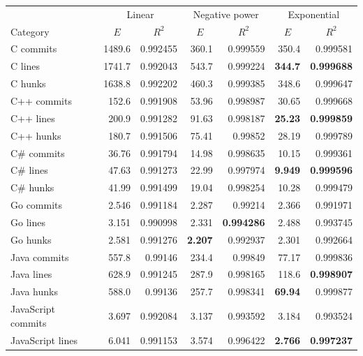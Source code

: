 \documentclass[pdflatex, sn-mathphys, referee]{sn-jnl}%
\theoremstyle{thmstyleone}%
\theoremstyle{thmstyletwo}%
\theoremstyle{thmstylethree}%
\def\tablelinesep{}
\theoremstyle{thmstyleone}
\begin{document}
\begin{table}[ht]
\begin{center}
\begin{minipage}{\textwidth}
\begin{tabular*}{\textwidth}{l r r r r r r}
\toprule%
  & \multicolumn{2}{c}{Linear} & \multicolumn{2}{c}{Negative power} & \multicolumn{2}{c}{Exponential} \\
Category & \multicolumn{1}{c}{$E$} & \multicolumn{1}{c}{$R^2$} & \multicolumn{1}{c}{$E$} & \multicolumn{1}{c}{$R^2$} & \multicolumn{1}{c}{$E$} & \multicolumn{1}{c}{$R^2$} \\
\midrule
C commits & 1489.6 & 0.992455 & 360.1 & 0.999559 & 350.4 & 0.999581 \\
C lines & 1741.7 & 0.992043 & 543.7 & 0.999224 & {\bf 344.7} & {\bf 0.999688} \\
C hunks & 1638.8 & 0.992202 & 460.3 & 0.999385 & 348.6 & 0.999647 \\ \tablelinesep
C++ commits & 152.6 & 0.991908 & 53.96 & 0.998987 & 30.65 & 0.999668 \\
C++ lines & 200.9 & 0.991282 & 91.63 & 0.998187 & {\bf 25.23} & {\bf 0.999859} \\
C++ hunks & 180.7 & 0.991506 & 75.41 & 0.99852 & 28.19 & 0.999789 \\ \tablelinesep
C\# commits & 36.76 & 0.991794 & 14.98 & 0.998635 & 10.15 & 0.999361 \\
C\# lines & 47.63 & 0.991273 & 22.99 & 0.997974 & {\bf 9.949} & {\bf 0.999596} \\
C\# hunks & 41.99 & 0.991499 & 19.04 & 0.998254 & 10.28 & 0.999479 \\ \tablelinesep
Go commits & 2.546 & 0.991184 & 2.287 & 0.99214 & 2.366 & 0.991971 \\
Go lines & 3.151 & 0.990998 & 2.331 & {\bf 0.994286} & 2.488 & 0.993745 \\
Go hunks & 2.581 & 0.991276 & {\bf 2.207} & 0.992937 & 2.301 & 0.992664 \\ \tablelinesep
Java commits & 557.8 & 0.99146 & 234.4 & 0.99849 & 77.17 & 0.999836 \\
Java lines & 628.9 & 0.991245 & 287.9 & 0.998165 & 118.6 & {\bf 0.998907} \\
Java hunks & 588.0 & 0.99136 & 257.7 & 0.998341 & {\bf 69.94} & 0.999877 \\ \tablelinesep
JavaScript commits & 3.697 & 0.992084 & 3.137 & 0.993592 & 3.184 & 0.993524 \\
JavaScript lines & 6.041 & 0.991153 & 3.574 & 0.996422 & {\bf 2.766} & {\bf 0.997237} \\

\end{tabular*}
\end{minipage}
\end{center}
\end{table}
\end{document}
